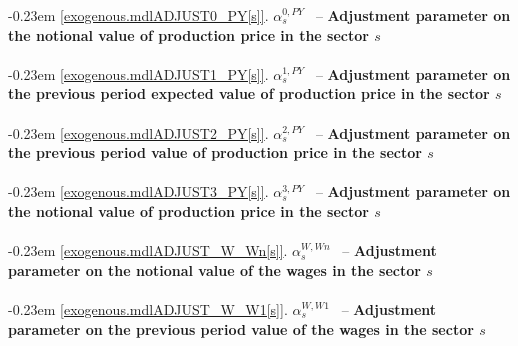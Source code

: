 \documentclass[12pt]{article}
\numberwithin{equation}{section}
\begin{document}
\noindent \kern-0.23em \noindent \begingroup {} \label{exogenous.mdlADJUST0_PY[s]}\ref{exogenous.mdlADJUST0_PY[s]}.
         
        \ensuremath{\alpha^{{0},PY}_{s}}~ \endgroup -- \noindent \textbf{Adjustment parameter on the notional value of production price in the sector $s$}  \\ \\[-8pt]


\noindent \kern-0.23em \noindent \begingroup {} \label{exogenous.mdlADJUST1_PY[s]}\ref{exogenous.mdlADJUST1_PY[s]}.
         
        \ensuremath{\alpha^{{1},PY}_{s}}~ \endgroup -- \noindent \textbf{Adjustment parameter on the previous period expected value of production price in the sector $s$}  \\ \\[-8pt]


\noindent \kern-0.23em \noindent \begingroup {} \label{exogenous.mdlADJUST2_PY[s]}\ref{exogenous.mdlADJUST2_PY[s]}.
         
        \ensuremath{\alpha^{{2},PY}_{s}}~ \endgroup -- \noindent \textbf{Adjustment parameter on the previous period value of production price in the sector $s$}  \\ \\[-8pt]


\noindent \kern-0.23em \noindent \begingroup {} \label{exogenous.mdlADJUST3_PY[s]}\ref{exogenous.mdlADJUST3_PY[s]}.
         
        \ensuremath{\alpha^{{3},PY}_{s}}~ \endgroup -- \noindent \textbf{Adjustment parameter on the notional value of production price in the sector $s$}  \\ \\[-8pt]


\noindent \kern-0.23em \noindent \begingroup {} \label{exogenous.mdlADJUST_W_Wn[s]}\ref{exogenous.mdlADJUST_W_Wn[s]}.
         
        \ensuremath{\alpha^{W,Wn}_{s}}~ \endgroup -- \noindent \textbf{Adjustment parameter on the notional value of the wages in the sector $s$}  \\ \\[-8pt]


\noindent \kern-0.23em \noindent \begingroup {} \label{exogenous.mdlADJUST_W_W1[s]}\ref{exogenous.mdlADJUST_W_W1[s]}.
         
        \ensuremath{\alpha^{W,W1}_{s}}~ \endgroup -- \noindent \textbf{Adjustment parameter on the previous period value of the wages in the sector $s$}  \\ \\[-8pt]
\end{document}
